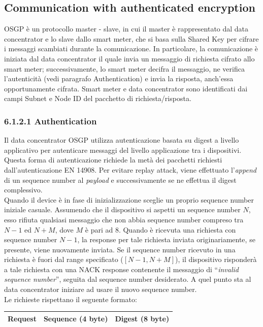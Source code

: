 \subsection{Communication with authenticated encryption \label{subsec:OSGPauth}}
OSGP è un protocollo master - slave, in cui il master è rappresentato dal data concentrator e lo slave dallo smart meter, che si basa sulla Shared Key per cifrare i messaggi scambiati durante la comunicazione. In particolare, la comunicazione è iniziata dal data concentrator il quale invia un messaggio di richiesta cifrato allo smart meter; successivamente, lo smart meter decifra il messaggio, ne verifica l'autenticità (vedi paragrafo Authentication) e invia la risposta, anch'essa opportunamente cifrata. Smart meter e data concentrator sono identificati dai campi Subnet e Node ID del pacchetto di richiesta/risposta.
\subsubsection{6.1.2.1 Authentication}
Il data concentrator OSGP utilizza autenticazione basata su digest a livello applicativo per autenticare messaggi del livello applicazione tra i dispositivi. Questa forma di autenticazione richiede la metà dei pacchetti richiesti dall'autenticazione EN 14908. Per evitare replay attack, viene effettuato l'\emph{append} di un sequence number al \emph{payload} e successivamente se ne effettua il digest complessivo.\\
Quando il device è in fase di inizializzazione sceglie un proprio sequence number iniziale casuale. Assumendo che il dispositivo si aspetti un sequence number $N$, esso rifiuta qualsiasi messaggio che non abbia sequence number compreso tra $N-1$ ed $N+M$, dove $M$ è pari ad 8. Quando è ricevuta una richiesta con sequence number $N-1$, la response per tale richiesta inviata originariamente, se presente, viene nuovamente inviata. Se il sequence number ricevuto in una richiesta è fuori dal range specificato ($[N-1, N+M]$), il dispositivo risponderà a tale richiesta con una NACK response contenente il messaggio di ``\emph{invalid sequence number}'', seguita dal sequence number desiderato. A quel punto sta al data concentrator iniziare ad usare il nuovo sequence number.\\
Le richieste rispettano il seguente formato:
\begin{table}[!h]
	\centering
	\begin{tabular}{|l|l|l|}
		\hline
		Request & Sequence (4 byte) & Digest (8 byte) \\ \hline
	\end{tabular}
\end{table}

